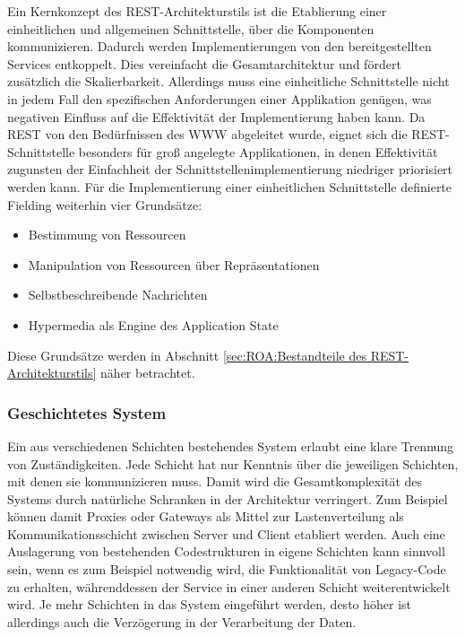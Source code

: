 Ein Kernkonzept des REST-Architekturstils ist die Etablierung einer einheitlichen und allgemeinen Schnittstelle, über die Komponenten kommunizieren. Dadurch werden Implementierungen von den bereitgestellten Services entkoppelt. Dies vereinfacht die Gesamtarchitektur und fördert zusätzlich die Skalierbarkeit. \parencite[vgl.][81\psq]{Fielding2000} Allerdings muss eine einheitliche Schnittstelle nicht in jedem Fall den spezifischen Anforderungen einer Applikation genügen, was negativen Einfluss auf die Effektivität der Implementierung haben kann. Da \ac{REST} von den Bedürfnissen des \ac{WWW} abgeleitet wurde, eignet sich die REST-Schnittstelle besonders für groß angelegte Applikationen, in denen Effektivität zugunsten der Einfachheit der Schnittstellenimplementierung niedriger priorisiert werden kann. Für die Implementierung einer einheitlichen Schnittstelle definierte Fielding \parencite[82]{Fielding2000} weiterhin vier Grundsätze:
\newpage
\begin{itemize}
\item Bestimmung von Ressourcen
\item Manipulation von Ressourcen über Repräsentationen
\item Selbstbeschreibende Nachrichten
\item Hypermedia als Engine des Application State
\end{itemize}
Diese Grundsätze werden in Abschnitt \ref{sec:ROA:Bestandteile des REST-Architekturstils} näher betrachtet.

\subsubsection{Geschichtetes System}

Ein aus verschiedenen Schichten bestehendes System erlaubt eine klare Trennung von Zuständigkeiten. Jede Schicht hat nur Kenntnis über die jeweiligen Schichten, mit denen sie kommunizieren muss. Damit wird die Gesamtkomplexität des Systems durch natürliche Schranken in der Architektur verringert. \parencite[vgl.][82\psqq]{Fielding2000} Zum Beispiel können damit Proxies oder Gateways als Mittel zur Lastenverteilung als Kommunikationsschicht zwischen Server und Client etabliert werden. Auch eine Auslagerung von bestehenden Codestrukturen in eigene Schichten kann sinnvoll sein, wenn es zum Beispiel notwendig wird, die Funktionalität von Legacy-Code zu erhalten, währenddessen der Service in einer anderen Schicht weiterentwickelt wird. Je mehr Schichten in das System eingeführt werden, desto höher ist allerdings auch die Verzögerung in der Verarbeitung der Daten.

